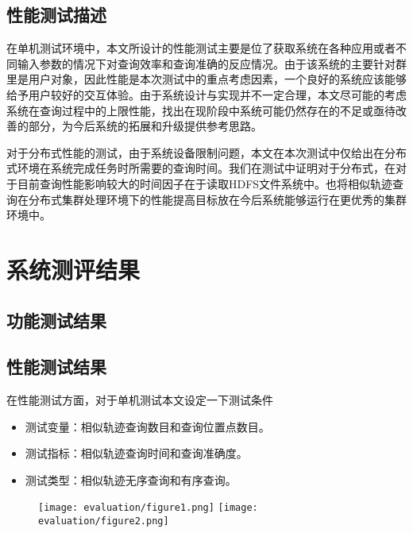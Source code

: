 \subsection{性能测试描述}
\label{subsec:performance test description}
在单机测试环境中，本文所设计的性能测试主要是位了获取系统在各种应用或者不同输入参数的情况下对查询效率和查询准确的反应情况。由于该系统的主要针对群里是用户对象，因此性能是本次测试中的重点考虑因素，一个良好的系统应该能够给予用户较好的交互体验。由于系统设计与实现并不一定合理，本文尽可能的考虑系统在查询过程中的上限性能，找出在现阶段中系统可能仍然存在的不足或亟待改善的部分，为今后系统的拓展和升级提供参考思路。

对于分布式性能的测试，由于系统设备限制问题，本文在本次测试中仅给出在分布式环境在系统完成任务时所需要的查询时间。我们在测试中证明对于分布式，在对于目前查询性能影响较大的时间因子在于读取HDFS文件系统中。也将相似轨迹查询在分布式集群处理环境下的性能提高目标放在今后系统能够运行在更优秀的集群环境中。

\section{系统测评结果}
\label{sec:test result}

\subsection{功能测试结果}
\label{subsec:function test result}

\subsection{性能测试结果}
\label{subsec:performance test result}

在性能测试方面，对于单机测试本文设定一下测试条件
\begin{itemize}
	\item 测试变量：相似轨迹查询数目和查询位置点数目。
	\item 测试指标：相似轨迹查询时间和查询准确度。
	\item 测试类型：相似轨迹无序查询和有序查询。
\end{itemize}

\begin{figure}[!htp]
  \centering
  \texttt{[image: evaluation/figure1.png]}
  \hspace{0.5cm}
  \texttt{[image: evaluation/figure2.png]}
\end{figure}

